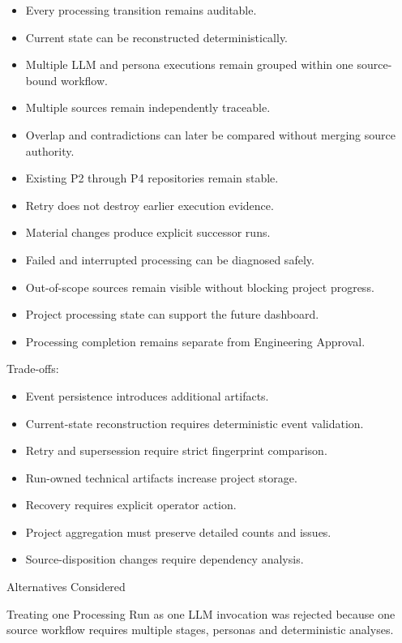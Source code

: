 \begin{itemize}
\tightlist
\item
  Every processing transition remains auditable.
\item
  Current state can be reconstructed deterministically.
\item
  Multiple LLM and persona executions remain grouped within one source-bound workflow.
\item
  Multiple sources remain independently traceable.
\item
  Overlap and contradictions can later be compared without merging source authority.
\item
  Existing P2 through P4 repositories remain stable.
\item
  Retry does not destroy earlier execution evidence.
\item
  Material changes produce explicit successor runs.
\item
  Failed and interrupted processing can be diagnosed safely.
\item
  Out-of-scope sources remain visible without blocking project progress.
\item
  Project processing state can support the future dashboard.
\item
  Processing completion remains separate from Engineering Approval.
\end{itemize}

Trade-offs:

\begin{itemize}
\tightlist
\item
  Event persistence introduces additional artifacts.
\item
  Current-state reconstruction requires deterministic event validation.
\item
  Retry and supersession require strict fingerprint comparison.
\item
  Run-owned technical artifacts increase project storage.
\item
  Recovery requires explicit operator action.
\item
  Project aggregation must preserve detailed counts and issues.
\item
  Source-disposition changes require dependency analysis.
\end{itemize}

Alternatives Considered

Treating one Processing Run as one LLM invocation was rejected because one source workflow requires multiple stages, personas and deterministic analyses.

